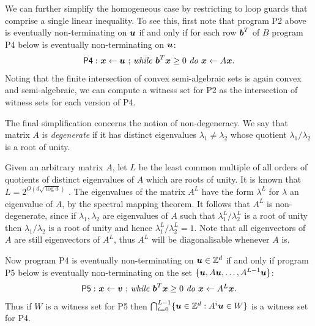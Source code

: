 We can further simplify the homogeneous case by restricting to loop
guards that comprise a single linear inequality.  To see this, first
note that program \textsf{P2} above is eventually non-terminating on
$\boldsymbol{u}$ if and only if for each row $\boldsymbol{b}^T$ of $B$
program \textsf{P4} below is eventually non-terminating on
$\boldsymbol{u}$:
\begin{gather*}
\mathsf{P4:}\ \mbox{$\boldsymbol{x}\gets \boldsymbol{u}$ ;
\textit{while} $\boldsymbol{b}^T\boldsymbol{x} \geq 0$ \textit{do} $\boldsymbol{x}\leftarrow A\boldsymbol{x}$.}
\end{gather*}
Noting that the finite intersection of convex semi-algebraic sets is
again convex and semi-algebraic, we can compute a witness set
for \textsf{P2} as the intersection of witness sets for each version
of \textsf{P4}.

The final simplification concerns the notion of
non-degeneracy.  We say that matrix $A$ is \emph{degenerate} if it has
distinct eigenvalues $\lambda_1 \neq \lambda_2$ whose quotient
$\lambda_1/\lambda_2$ is a root of unity.

Given an arbitrary matrix $A$, let $L$ be the least common multiple of all orders of quotients of distinct eigenvalues of $A$ which are roots
of unity. It is known that $L=2^{O(d\sqrt{\log d})}$ \cite{BOOK}.  The
eigenvalues of the matrix $A^L$ have the form $\lambda^L$ for
$\lambda$ an eigenvalue of $A$, by the spectral mapping theorem.  It follows that
$A^L$ is non-degenerate, since if $\lambda_1,\lambda_2$ are
eigenvalues of $A$ such that $\lambda^L_1/\lambda^L_2$ is a root of
unity then $\lambda_1/\lambda_2$ is a root of unity and hence
$\lambda^L_1/\lambda^L_2=1$. Note that all eigenvectors of $A$ are still eigenvectors of $A^L$, thus $A^L$ will be diagonalisable whenever $A$ is.

Now program \textsf{P4} is eventually non-terminating on
$\boldsymbol{u}\in \mathbb{Z}^d$ if and only if program \textsf{P5}
below is eventually non-terminating on the set
$\{\boldsymbol{u},A\boldsymbol{u}, \ldots,A^{L-1}\boldsymbol{u}\}$:
\begin{gather*}
\mathsf{P5:}\ \mbox{$\boldsymbol{x}\gets \boldsymbol{v}$ ;
\textit{while} $\boldsymbol b^T\boldsymbol{x} \geq 0$ \textit{do} $\boldsymbol{x}\leftarrow A^L\boldsymbol{x}$.}
\end{gather*}
Thus if $W$ is a witness set for \textsf{P5} then $\bigcap_{i=0}^{L-1}
\{ \boldsymbol{u} \in \mathbb{Z}^d : A^i\boldsymbol{u} \in W\}$ is a witness set for
\textsf{P4}.


